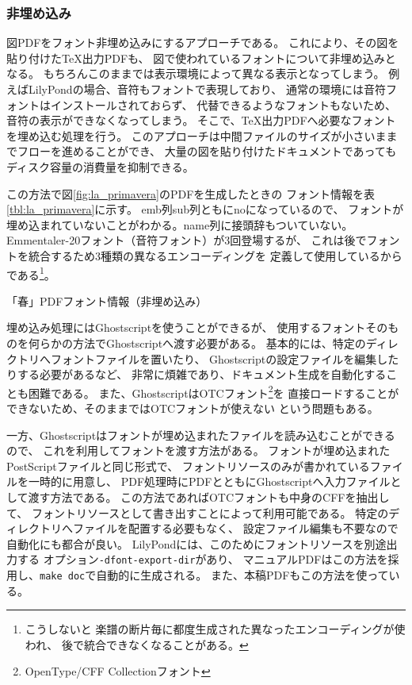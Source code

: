 \documentclass[twocolumn,jafontscale=0.962216,jlreq_notes]{jlreq}
\begin{document}
\subsubsection{非埋め込み}

図PDFをフォント非埋め込みにするアプローチである。
これにより、その図を貼り付けた\TeX 出力PDFも、
図で使われているフォントについて非埋め込みとなる。
もちろんこのままでは表示環境によって異なる表示となってしまう。
例えばLilyPondの場合、音符もフォントで表現しており、
通常の環境には音符フォントはインストールされておらず、
代替できるようなフォントもないため、音符の表示ができなくなってしまう。
そこで、\TeX 出力PDFへ必要なフォントを埋め込む処理を行う。
このアプローチは中間ファイルのサイズが小さいままでフローを進めることができ、
大量の図を貼り付けたドキュメントであってもディスク容量の消費量を抑制できる。

この方法で図\ref{fig:la_primavera}のPDFを生成したときの
フォント情報を表\ref{tbl:la_primavera}に示す。
emb列sub列ともにnoになっているので、
フォントが埋め込まれていないことがわかる。name列に接頭辞もついていない。
Emmentaler-20フォント（音符フォント）が3回登場するが、
これは後でフォントを統合するため3種類の異なるエンコーディングを
定義して使用しているからである\footnote{こうしないと
楽譜の断片毎に都度生成された異なったエンコーディングが使われ、
後で統合できなくなることがある。}。

\begin{table}
  \centering
  \caption{「春」PDFフォント情報（非埋め込み）}
  \label{tbl:la_primavera}
\end{table}

埋め込み処理にはGhostscriptを使うことができるが、
使用するフォントそのものを何らかの方法でGhostscriptへ渡す必要がある。
基本的には、特定のディレクトリへフォントファイルを置いたり、
Ghostscriptの設定ファイルを編集したりする必要があるなど、
非常に煩雑であり、ドキュメント生成を自動化することも困難である。
また、GhostscriptはOTCフォント\footnote{OpenType/CFF Collectionフォント}を
直接ロードすることができないため、そのままではOTCフォントが使えない
という問題もある。

一方、Ghostscriptはフォントが埋め込まれたファイルを読み込むことができるので、
これを利用してフォントを渡す方法がある。
フォントが埋め込まれたPostScriptファイルと同じ形式で、
フォントリソースのみが書かれているファイルを一時的に用意し、
PDF処理時にPDFとともにGhostscriptへ入力ファイルとして渡す方法である。
この方法であればOTCフォントも中身のCFFを抽出して、
フォントリソースとして書き出すことによって利用可能である。
特定のディレクトリへファイルを配置する必要もなく、
設定ファイル編集も不要なので自動化にも都合が良い。
LilyPondには、このためにフォントリソースを別途出力する
オプション\verb|-dfont-export-dir|があり、
マニュアルPDFはこの方法を採用し、\verb|make doc|で自動的に生成される。
また、本稿PDFもこの方法を使っている。
\end{document}
